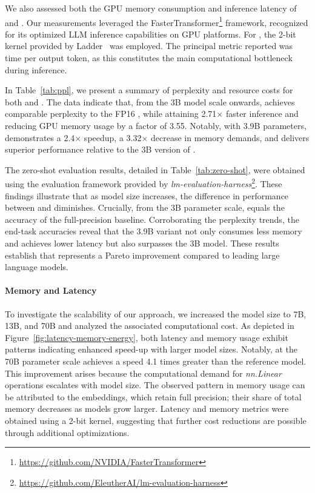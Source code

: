 We also assessed both the GPU memory consumption and inference latency of  and . Our measurements leveraged the FasterTransformer\footnote{\url{https://github.com/NVIDIA/FasterTransformer}} framework, recognized for its optimized LLM inference capabilities on GPU platforms. For , the 2-bit kernel provided by Ladder~\cite{ladder} was employed. The principal metric reported was time per output token, as this constitutes the main computational bottleneck during inference.

In Table~\ref{tab:ppl}, we present a summary of perplexity and resource costs for both  and . The data indicate that, from the 3B model scale onwards,  achieves comparable perplexity to the FP16 , while attaining 2.71$\times$ faster inference and reducing GPU memory usage by a factor of 3.55. Notably, with 3.9B parameters,  demonstrates a 2.4$\times$ speedup, a 3.32$\times$ decrease in memory demands, and delivers superior performance relative to the 3B version of .

The zero-shot evaluation results, detailed in Table~\ref{tab:zero-shot}, were obtained using the evaluation framework provided by \emph{lm-evaluation-harness}\footnote{\url{https://github.com/EleutherAI/lm-evaluation-harness}}. These findings illustrate that as model size increases, the difference in performance between  and  diminishes. Crucially, from the 3B parameter scale,  equals the accuracy of the full-precision baseline. Corroborating the perplexity trends, the end-task accuracies reveal that the 3.9B  variant not only consumes less memory and achieves lower latency but also surpasses the  3B model. These results establish that  represents a Pareto improvement compared to leading large language models.

\paragraph{Memory and Latency}

To investigate the scalability of our approach, we increased the model size to 7B, 13B, and 70B and analyzed the associated computational cost. As depicted in Figure~\ref{fig:latency-memory-energy}, both latency and memory usage exhibit patterns indicating enhanced speed-up with larger model sizes. Notably,  at the 70B parameter scale achieves a speed 4.1 times greater than the  reference model. This improvement arises because the computational demand for \emph{nn.Linear} operations escalates with model size. The observed pattern in memory usage can be attributed to the embeddings, which retain full precision; their share of total memory decreases as models grow larger. Latency and memory metrics were obtained using a 2-bit kernel, suggesting that further cost reductions are possible through additional optimizations.

